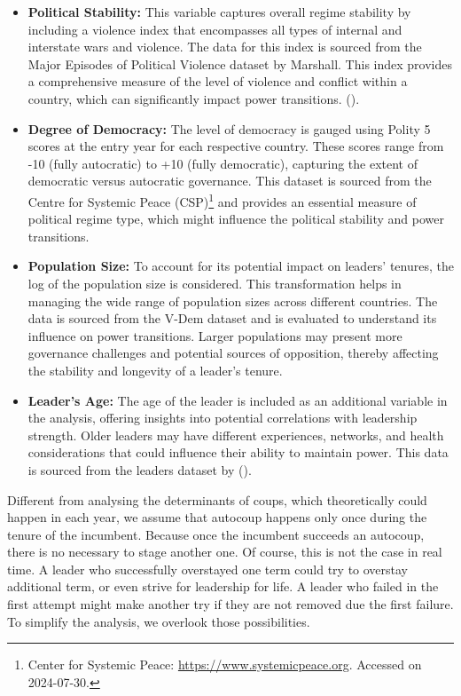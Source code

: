 \documentclass[
  12pt,
]{report}
\begin{document}
\begin{itemize}
\item
  \textbf{Political Stability:} This variable captures overall regime
  stability by including a violence index that encompasses all types of
  internal and interstate wars and violence. The data for this index is
  sourced from the Major Episodes of Political Violence dataset by
  Marshall. This index provides a comprehensive measure of the level of
  violence and conflict within a country, which can significantly impact
  power transitions. ().
\item
  \textbf{Degree of Democracy:} The level of democracy is gauged using
  Polity 5 scores at the entry year for each respective country. These
  scores range from -10 (fully autocratic) to +10 (fully democratic),
  capturing the extent of democratic versus autocratic governance. This
  dataset is sourced from the Centre for Systemic Peace (CSP)\footnote{Center
    for Systemic Peace: \url{https://www.systemicpeace.org}. Accessed on
    2024-07-30.} and provides an essential measure of political regime
  type, which might influence the political stability and power
  transitions.
\item
  \textbf{Population Size:} To account for its potential impact on
  leaders' tenures, the log of the population size is considered. This
  transformation helps in managing the wide range of population sizes
  across different countries. The data is sourced from the V-Dem dataset
  and is evaluated to understand its influence on power transitions.
  Larger populations may present more governance challenges and
  potential sources of opposition, thereby affecting the stability and
  longevity of a leader's tenure.
\item
  \textbf{Leader's Age:} The age of the leader is included as an
  additional variable in the analysis, offering insights into potential
  correlations with leadership strength. Older leaders may have
  different experiences, networks, and health considerations that could
  influence their ability to maintain power. This data is sourced from
  the leaders dataset by ().
\end{itemize}

Different from analysing the determinants of coups, which theoretically
could happen in each year, we assume that autocoup happens only once
during the tenure of the incumbent. Because once the incumbent succeeds
an autocoup, there is no necessary to stage another one. Of course, this
is not the case in real time. A leader who successfully overstayed one
term could try to overstay additional term, or even strive for
leadership for life. A leader who failed in the first attempt might make
another try if they are not removed due the first failure. To simplify
the analysis, we overlook those possibilities.
\end{document}
